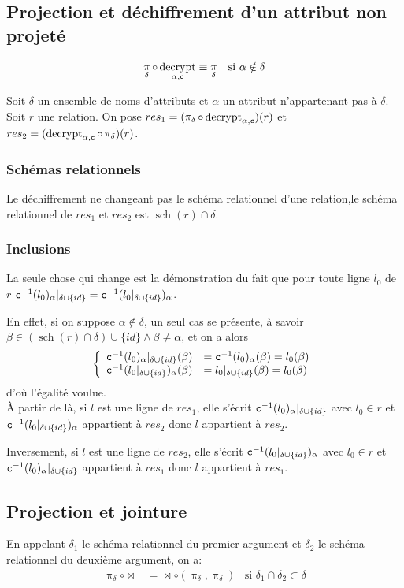 \documentclass[french]{article}
\DeclareMathOperator{\proj}{\pi}
\DeclareMathOperator{\decrypt}{decrypt}
\DeclareMathOperator{\s}{sch}
\newcommand\typeT[1]{\text{\ttfamily #1}}
\newcommand{\decryptArgs}[2]{\decrypt_{#1 , \typeT{#2}}}
\newcommand{\projDelta}{\proj_{\delta}}
\newcommand{\dc}[1]{\typeT{c}^{-1}(#1)}
\newcommand{\cip}{\cup \{id\}}
\newcommand{\intro}[2]{Soit $r$ une relation. On pose $res_1 = (#1)(r) $ et $res_2 = (#2)(r) $}
\begin{document}
\subsection*{Projection et déchiffrement d'un attribut non projeté}
\begin{align}
\projDelta \circ \decryptArgs{\alpha}{c}
& \equiv \projDelta
&\text{si $\alpha \notin \delta$} 
\end{align}

Soit $\delta$ un ensemble de noms d'attributs
et $\alpha$ un attribut n'appartenant pas à $\delta$.
\intro{\projDelta \circ \decryptArgs{\alpha}{c}}{\decryptArgs{\alpha}{c} \circ \projDelta}.

\subsubsection*{Schémas relationnels}
Le déchiffrement ne changeant pas le schéma relationnel
d'une relation,le schéma relationnel de $res_1$ et $res_2$
est $\s(r) \cap \delta$.

\subsubsection*{Inclusions}
La seule chose qui change est la démonstration du fait que 
pour toute ligne $l_0$ de $r$
$\dc{l_0}_\alpha|_{\delta \cip} = \dc{l_0|_{\delta \cip}}_\alpha$.

En effet, si on suppose $\alpha \notin \delta$, un seul cas se présente,
à savoir
$\beta \in (\s(r) \cap \delta) \cip \wedge \beta \neq \alpha$, et on a alors
$$
\left\lbrace
\begin{array}{ll}
\dc{l_0}_\alpha|_{\delta \cip}(\beta) 
& = \dc{l_0}_\alpha(\beta) = l_0(\beta) \\
\dc{l_0|_{\delta \cip}}_\alpha (\beta)
& = l_0|_{\delta \cip}(\beta) = l_0(\beta)
\end{array}
\right.
$$
d'où l'égalité voulue. \\

À partir de là, si $l$ est une ligne de $res_1$,
elle s'écrit $\dc{l_0}_\alpha|_{\delta \cip}$
avec $l_0 \in r$ et $\dc{l_0|_{\delta \cip}}_\alpha$
appartient à $res_2$ donc $l$ appartient à $res_2$.

Inversement, si $l$ est une ligne de $res_2$,
elle s'écrit $\dc{l_0|_{\delta \cip}}_\alpha$
avec $l_0 \in r$ et $\dc{l_0}_\alpha|_{\delta \cip}$
appartient à $res_1$ donc $l$ appartient à $res_1$.

\subsection*{Projection et jointure}
En appelant $\delta_1$ le schéma relationnel du premier
argument et $\delta_2$ le schéma relationnel du deuxième argument,
on a:
\begin{align}
\projDelta \circ \Join
& = \Join \circ (\projDelta, \projDelta)
& \text{si $\delta_1 \cap \delta_2 \subset \delta$}
\end{align}
\end{document}
